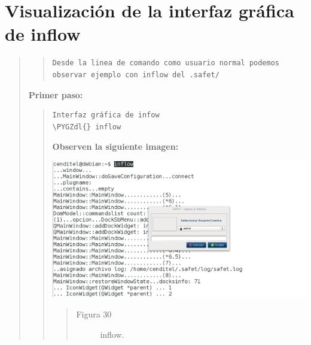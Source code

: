 \documentclass[letterpaper,11pt,spanish]{sphinxmanual}
\def\PYGZdl{\char`\$}
\begin{document}
\begin{quote}
\begin{quote}
\begin{quote}
\begin{description}
\end{description}\end{quote}
\end{quote}
\end{quote}


\chapter{Visualización de la interfaz gráfica de inflow}
\label{_templates/Contenido7/visualizacion:visualizacion-de-la-interfaz-grafica-de-inflow}\label{_templates/Contenido7/visualizacion::doc}\begin{quote}
\begin{quote}

\begin{Verbatim}[commandchars=\\\{\}]
Desde la linea de comando como usuario normal podemos observar ejemplo con inflow del .safet/
\end{Verbatim}
\end{quote}

\textbf{Primer paso:}
\begin{quote}

\begin{Verbatim}[commandchars=\\\{\}]
Interfaz gráfica de infow
\PYGZdl{} inflow
\end{Verbatim}

\textbf{Observen la siguiente imagen:}

\includegraphics{inflow5.png}
\begin{quote}\begin{description}
\item[{Figura 30}] \leavevmode
inflow.

\end{description}\end{quote}
\end{quote}


\end{quote}
\end{document}
